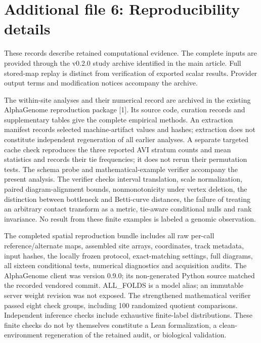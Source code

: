 \documentclass[
  11pt,
]{article}
\author{}
\date{}
\begin{document}
\section{Additional file 6: Reproducibility
details}\label{additional-file-6-reproducibility-details}

These records describe retained computational evidence. The complete
inputs are provided through the v0.2.0 study archive identified in the
main article. Full stored-map replay is distinct from verification of
exported scalar results. Provider output terms and modification notices
accompany the archive.

The within-site analyses and their numerical record are archived in the
existing AlphaGenome reproduction package {[}1{]}. Its source code,
curation records and supplementary tables give the complete empirical
methods. An extraction manifest records selected machine-artifact values
and hashes; extraction does not constitute independent regeneration of
all earlier analyses. A separate targeted cache check reproduces the
three reported AVI stratum counts and mean statistics and records their
tie frequencies; it does not rerun their permutation tests. The schema
probe and mathematical-example verifier accompany the present analysis.
The verifier checks interval translation, scale normalization, paired
diagram-alignment bounds, nonmonotonicity under vertex deletion, the
distinction between bottleneck and Betti-curve distances, the failure of
treating an arbitrary contact transform as a metric, tie-aware
conditional nulls and rank invariance. No result from these finite
examples is labeled a genomic observation.

The completed spatial reproduction bundle includes all raw per-call
reference/alternate maps, assembled site arrays, coordinates, track
metadata, input hashes, the locally frozen protocol, exact-matching
settings, full diagrams, all sixteen conditional tests, numerical
diagnostics and acquisition audits. The AlphaGenome client was version
0.9.0; its non-generated Python source matched the recorded vendored
commit. ALL\_FOLDS is a model alias; an immutable server weight revision
was not exposed. The strengthened mathematical verifier passed eight
check groups, including 100 randomized quotient comparisons. Independent
inference checks include exhaustive finite-label distributions. These
finite checks do not by themselves constitute a Lean formalization, a
clean-environment regeneration of the retained audit, or biological
validation.
\end{document}
